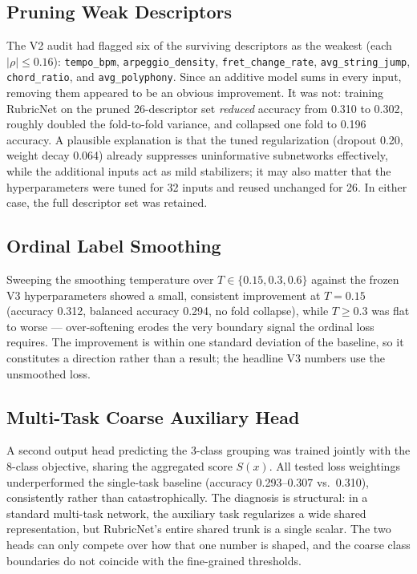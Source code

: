 \subsection{Pruning Weak Descriptors}
\label{sec:pruning}
The V2 audit had flagged six of the surviving descriptors as the weakest (each $|\rho| \le 0.16$): \texttt{tempo\_bpm}, \texttt{arpeggio\_density}, \texttt{fret\_change\_rate}, \texttt{avg\_string\_jump}, \texttt{chord\_ratio}, and \texttt{avg\_polyphony}. Since an additive model sums in every input, removing them appeared to be an obvious improvement. It was not: training RubricNet on the pruned 26-descriptor set \emph{reduced} accuracy from 0.310 to 0.302, roughly doubled the fold-to-fold variance, and collapsed one fold to 0.196 accuracy. A plausible explanation is that the tuned regularization (dropout 0.20, weight decay 0.064) already suppresses uninformative subnetworks effectively, while the additional inputs act as mild stabilizers; it may also matter that the hyperparameters were tuned for 32 inputs and reused unchanged for 26. In either case, the full descriptor set was retained.

\subsection{Ordinal Label Smoothing}
\label{sec:smoothing}
Sweeping the smoothing temperature over $T \in \{0.15, 0.3, 0.6\}$ against the frozen V3 hyperparameters showed a small, consistent improvement at $T = 0.15$ (accuracy 0.312, balanced accuracy 0.294, no fold collapse), while $T \ge 0.3$ was flat to worse --- over-softening erodes the very boundary signal the ordinal loss requires. The improvement is within one standard deviation of the baseline, so it constitutes a direction rather than a result; the headline V3 numbers use the unsmoothed loss.

\subsection{Multi-Task Coarse Auxiliary Head}
A second output head predicting the 3-class grouping was trained jointly with the 8-class objective, sharing the aggregated score $S(x)$. All tested loss weightings underperformed the single-task baseline (accuracy 0.293--0.307 vs.\ 0.310), consistently rather than catastrophically. The diagnosis is structural: in a standard multi-task network, the auxiliary task regularizes a wide shared representation, but RubricNet's entire shared trunk is a single scalar. The two heads can only compete over how that one number is shaped, and the coarse class boundaries do not coincide with the fine-grained thresholds.

